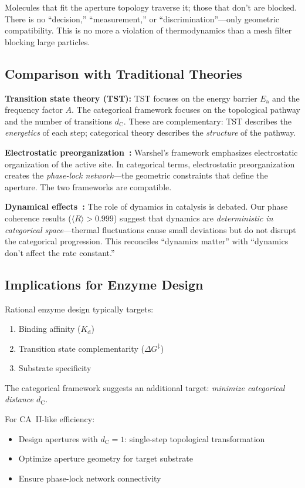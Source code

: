 \documentclass[twocolumn,amsmath,amssymb,aps,prb,superscriptaddress,longbibliography]{revtex4-2}
\newcommand{\dC}{d_{\mathrm{C}}}
\newcommand{\Ea}{E_{\mathrm{a}}}
\newcommand{\DG}{\Delta G^{\ddagger}}
\begin{document}
Molecules that fit the aperture topology traverse it; those that don't are blocked. There is no ``decision,'' ``measurement,'' or ``discrimination''---only geometric compatibility. This is no more a violation of thermodynamics than a mesh filter blocking large particles.

\subsection{Comparison with Traditional Theories}

\textbf{Transition state theory (TST):} TST focuses on the energy barrier $\Ea$ and the frequency factor $A$. The categorical framework focuses on the topological pathway and the number of transitions $\dC$. These are complementary: TST describes the \emph{energetics} of each step; categorical theory describes the \emph{structure} of the pathway.

\textbf{Electrostatic preorganization~\cite{Warshel1998}:} Warshel's framework emphasizes electrostatic organization of the active site. In categorical terms, electrostatic preorganization creates the \emph{phase-lock network}---the geometric constraints that define the aperture. The two frameworks are compatible.

\textbf{Dynamical effects~\cite{Kamerlin2010, Kohen2015}:} The role of dynamics in catalysis is debated. Our phase coherence results ($\langle R \rangle > 0.999$) suggest that dynamics are \emph{deterministic in categorical space}---thermal fluctuations cause small deviations but do not disrupt the categorical progression. This reconciles ``dynamics matter'' with ``dynamics don't affect the rate constant.''

\subsection{Implications for Enzyme Design}

Rational enzyme design typically targets:
\begin{enumerate}
\item Binding affinity ($K_{\text{d}}$)
\item Transition state complementarity ($\DG$)
\item Substrate specificity
\end{enumerate}

The categorical framework suggests an additional target: \emph{minimize categorical distance $\dC$}.

For CA~II-like efficiency:
\begin{itemize}
\item Design apertures with $\dC = 1$: single-step topological transformation
\item Optimize aperture geometry for target substrate
\item Ensure phase-lock network connectivity
\end{itemize}
\end{document}
